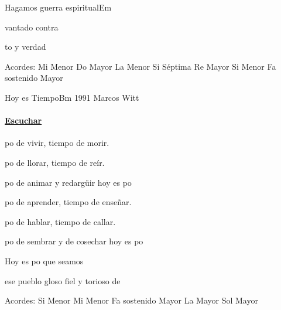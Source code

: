 \documentclass[12pt, spanish]{book}
\begin{document}
\begin{song}{Hagamos guerra espiritual}{Em}
        \begin{SBChorus}
            vantado contra

            to y  verdad
        \end{SBChorus}

        \ifChordBk
        \begin{SBOpGroup}
            Acordes:
            \upchord{\Em}\qquad Mi Menor \hfill
            \upchord{\C}\qquad Do Mayor \hfill\null\break
            \upchord{\Am}\qquad La Menor \hfill
            \upchord{\Bseven}\qquad Si S\'eptima \hfill\null\break
            \upchord{\D}\qquad Re Mayor \hfill
            \upchord{\Bm}\qquad Si Menor \hfill\null\break
            \upchord{\Fs}Fa sostenido Mayor \hfill\null\break
        \end{SBOpGroup}
        \fi
    \end{song}

    \begin{song}{Hoy es Tiempo}{Bm}
    {1991} %
    {Marcos Witt}
    {} %
    {}
        \ifChordBk
        \paragraph{\mbox{}\hfill\protect\href{https://open.spotify.com/intl-es/track/3IfjNC2pFfp5okvoV8ez0t}{Escuchar}\mbox{}\hfill}
        \fi

        \begin{SBOpGroup}
            po de vivir, tiempo de morir.

            po de llorar, tiempo de reír.

            po de animar y redargüir hoy es po
        \end{SBOpGroup}
        \vskip 20pt
        \begin{SBOpGroup}
            po de aprender, tiempo de enseñar.

            po de hablar, tiempo de callar.

            po de sembrar y de cosechar hoy es po
        \end{SBOpGroup}

        \begin{SBChorus}
            Hoy es po que seamos

            ese pueblo gloso fiel y torioso de 
        \end{SBChorus}

        \ifChordBk
        \begin{SBOpGroup}
            Acordes:\break
            \upchord{\Bm}\qquad Si Menor \hfill
            \upchord{\Em}\qquad Mi Menor \hfill\null\break
            \upchord{\Fs}\qquad Fa sostenido Mayor \hfill
            \upchord{\A}\qquad La Mayor \hfill\null\break
            \upchord{\G}\qquad Sol Mayor \hfill\null\break
        \end{SBOpGroup}
        \fi
    \end{song}
\end{document}
